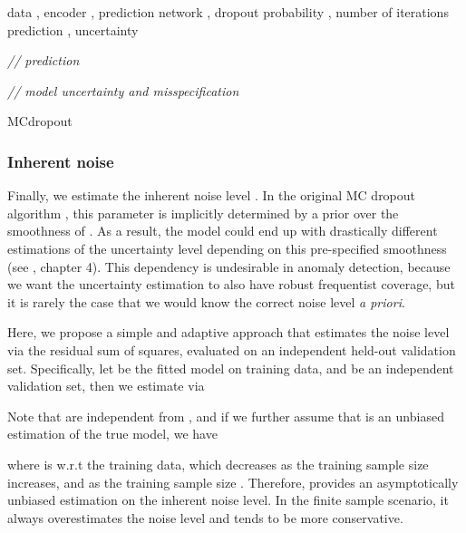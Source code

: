 \documentclass[conference,compsoc,final]{IEEEtran}
\begin{document}
\begin{algorithm}[H]

 \begin{algorithmic}[1]
 \renewcommand{\algorithmicrequire}{\textbf{Input:}}
 \renewcommand{\algorithmicensure}{\textbf{Output:}}
 \REQUIRE data , encoder , prediction network , dropout probability , number of iterations 
 \ENSURE prediction , uncertainty 
 \\
 \vspace{3pt}

  \STATE 
  \ENDFOR
  
  \vspace{3pt}
  \textit{// prediction}
  \STATE 
  
  \vspace{3pt}
  \textit{// model uncertainty and misspecification}
  \STATE 

 \RETURN 
 \end{algorithmic}
 \caption{MCdropout}
 \label{algo:dropout}
 \end{algorithm}
 
\subsubsection{Inherent noise}
Finally, we estimate the inherent noise level . In the original MC dropout algorithm \cite{gal2016dropout}, this parameter is implicitly determined by a prior over the smoothness of . As a result, the model could end up with drastically different estimations of the uncertainty level depending on this pre-specified smoothness (see \cite{gal2016uncertainty}, chapter 4). This dependency is undesirable in anomaly detection, because we want the uncertainty estimation to also have robust frequentist coverage, but it is rarely the case that we would know the correct noise level {\it a priori}.

Here, we propose a simple and adaptive approach that estimates the noise level via the residual sum of squares, evaluated on an independent held-out validation set. Specifically, let  be the fitted model on training data, and  be an independent validation set, then we estimate  via

Note that  are independent from , 
and if we further assume that  is an unbiased estimation of the true model, we have 

where  is w.r.t the training data, which decreases as the training sample size increases, and  as the training sample size . Therefore,  provides an asymptotically unbiased estimation on the inherent noise level. In the finite sample scenario, it always overestimates the noise level and tends to be more conservative.
\end{document}
